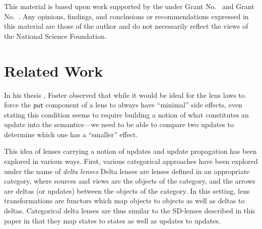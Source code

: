 \documentclass[acmsmall,review,anonymous]{acmart}\settopmatter{printfolios=true,printccs=false,printacmref=false}
\newcommand{\kw}[1]{\ensuremath{\mathsf{#1}}\xspace}
\newcommand{\pput}{\ensuremath{\kw{put}}\xspace}
\begin{document}
\begin{acks}                            %
This material is based upon work supported by the
 under Grant
No.~ and Grant
No.~.  Any opinions, findings, and
conclusions or recommendations expressed in this material are those
of the author and do not necessarily reflect the views of the
National Science Foundation.
\end{acks}

\section{Related Work}
In his thesis \cite{foster2009bidirectional}, Foster observed that while it would be
ideal for the lens laws to force the \pput component of a lens to always have
``minimal'' side effects, even stating this condition seems to require
building a notion of what constitutes an update into the semantics---we need to
be able to compare two updates to determine which one has a ``smaller'' effect.

This idea of lenses carrying a notion of updates and update propagation has been
explored in various ways. First, various categorical approaches have been
explored under the name of {\em delta lenses}
\cite{diskin2011state,diskin2011asymmetric,johnson2017symmetric,pacheco2012delta,johnson2012lenses} Delta lenses are lenses defined in an appropriate category, where sources and
views are the objects of the category, and the arrows are deltas (or updates)
between the objects of the category. In this setting, lens transformations are
functors which map objects to objects as well as deltas to deltas. Categorical
delta lenses are thus similar to the SD-lenses described in this paper in that
they map states to states as well as updates to updates.
\end{document}
